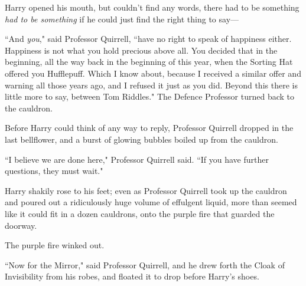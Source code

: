 Harry opened his mouth, but couldn't find any words, there had to be something \emph{had to be something} if he could just find the right thing to say—

``And \emph{you}," said Professor Quirrell, ``have no right to speak of happiness either. Happiness is not what you hold precious above all. You decided that in the beginning, all the way back in the beginning of this year, when the Sorting Hat offered you Hufflepuff. Which I know about, because I received a similar offer and warning all those years ago, and I refused it just as you did. Beyond this there is little more to say, between Tom Riddles." The Defence Professor turned back to the cauldron.

Before Harry could think of any way to reply, Professor Quirrell dropped in the last bellflower, and a burst of glowing bubbles boiled up from the cauldron.

``I believe we are done here," Professor Quirrell said. ``If you have further questions, they must wait."

Harry shakily rose to his feet; even as Professor Quirrell took up the cauldron and poured out a ridiculously huge volume of effulgent liquid, more than seemed like it could fit in a dozen cauldrons, onto the purple fire that guarded the doorway.

The purple fire winked out.

``Now for the Mirror," said Professor Quirrell, and he drew forth the Cloak of Invisibility from his robes, and floated it to drop before Harry's shoes.

